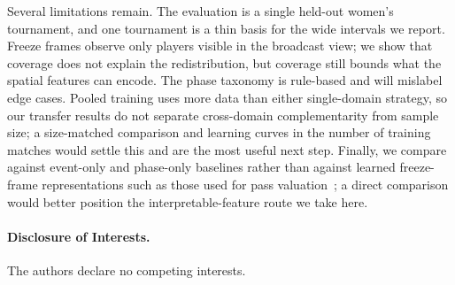 \documentclass[runningheads]{llncs}
\begin{document}
Several limitations remain. The evaluation is a single held-out women's tournament, and one tournament is a thin basis for the wide intervals we report. Freeze frames observe only players visible in the broadcast view; we show that coverage does not explain the redistribution, but coverage still bounds what the spatial features can encode. The phase taxonomy is rule-based and will mislabel edge cases. Pooled training uses more data than either single-domain strategy, so our transfer results do not separate cross-domain complementarity from sample size; a size-matched comparison and learning curves in the number of training matches would settle this and are the most useful next step. Finally, we compare against event-only and phase-only baselines rather than against learned freeze-frame representations such as those used for pass valuation~\cite{robberechts2023unxpass}; a direct comparison would better position the interpretable-feature route we take here.
\paragraph{Disclosure of Interests.}
The authors declare no competing interests.


\end{document}
